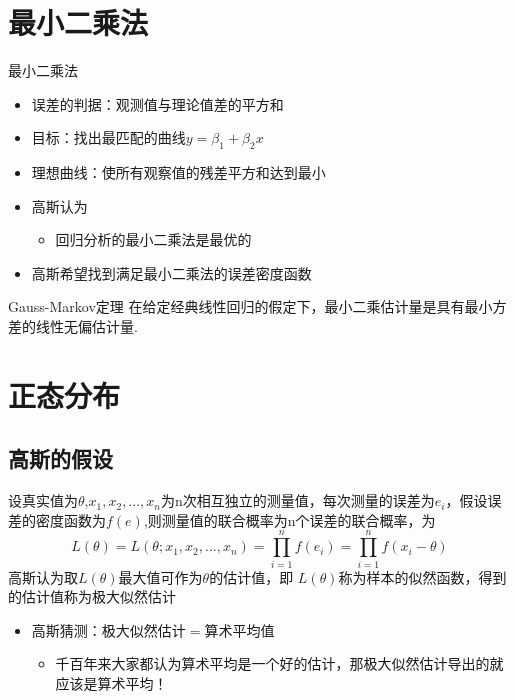 \documentclass[14pt,hyperref={CJKbookmarks=true}]{beamer}
\begin{document}
\section{最小二乘法}
\begin{frame}{最小二乘法}
\begin{itemize}
\item 误差的判据：观测值与理论值差的平方和
\item 目标：找出最匹配的曲线$y=\beta_{1}+\beta_{2}x$
\item 理想曲线：使所有观察值的残差平方和达到最小
\end{itemize}
\end{frame}
\begin{frame}
\begin{itemize}
\item 高斯认为
\begin{itemize}
\item 回归分析的最小二乘法是最优的
\end{itemize}
\item 高斯希望找到满足最小二乘法的误差密度函数
\end{itemize}
\begin{theorem}{Gauss-Markov定理}
在给定经典线性回归的假定下，最小二乘估计量是具有最小方差的线性无偏估计量.
\end{theorem}
\end{frame}
\section{正态分布}
\subsection{高斯的假设}
\begin{frame}[fragile]
设真实值为$\theta$,$x_1,x_2,...,x_n$为n次相互独立的测量值，每次测量的误差为$e_i$，假设误差的密度函数为$f(e)$,则测量值的联合概率为n个误差的联合概率，为
\[L(\theta)=L(\theta;x_1,x_2,...,x_n)=\prod_{i=1}^{n}f(e_i)=\prod_{i=1}^{n}f(x_i-\theta)\]
高斯认为取$L(\theta)$最大值可作为$\theta$的估计值，即
$L(\theta)$称为样本的似然函数，得到的估计值称为极大似然估计
\end{frame}
\begin{frame}
\begin{itemize}
\item 高斯猜测：极大似然估计$=$算术平均值
\begin{itemize}
\item 千百年来大家都认为算术平均是一个好的估计，那极大似然估计导出的就应该是算术平均！
\end{itemize}
\end{itemize}
\end{frame}
\end{document}
